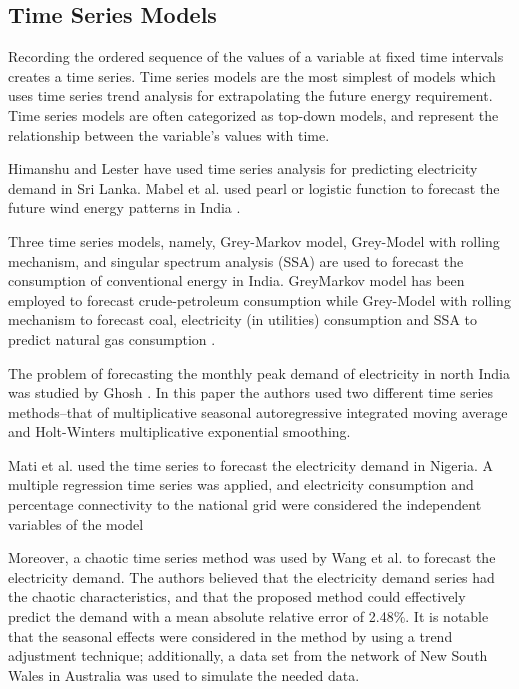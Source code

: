 \documentclass[lettersize,journal]{IEEEtran}
\begin{document}
  \subsection{Time Series Models}

Recording the ordered sequence of the values of a variable at fixed time intervals creates a time series. Time series models are the most simplest of models which uses time series trend analysis for extrapolating the future energy requirement. Time series models are often categorized as top-down models, and represent the relationship between the variable's values with time.  

Himanshu and Lester \cite{srilanka} have used time series analysis for predicting electricity demand in Sri Lanka. Mabel et al. used pearl or logistic function to forecast the future wind energy patterns in India \cite{TSA-india}.

Three time series models, namely, Grey-Markov model, Grey-Model with rolling mechanism, and singular spectrum analysis (SSA) are used to forecast the consumption of conventional energy in India. GreyMarkov model has been employed to forecast crude-petroleum consumption while Grey-Model with rolling mechanism to forecast coal, electricity (in utilities) consumption and SSA to predict natural gas consumption \cite{time-serie india}.

The problem of forecasting the monthly peak demand of electricity in north India was studied by Ghosh \cite{time-serie india ghosh}. In this paper the authors used two different time series methods–that of multiplicative seasonal autoregressive integrated moving average and Holt-Winters multiplicative exponential smoothing. 

Mati et al. \cite{time-serie Nigeria}used the time series to forecast the electricity demand in Nigeria. A multiple regression time series was applied, and electricity consumption and percentage connectivity to the national grid were considered the independent variables of the model

Moreover, a chaotic time series method was used by Wang et al. \cite{time-serie china}to forecast the electricity demand. The authors believed that the electricity demand series had the chaotic characteristics, and that the
proposed method could effectively predict the demand with a mean absolute relative error of 2.48\%. It is notable that the seasonal effects were considered in the method by using a trend adjustment technique; additionally, a data set from the network of New South Wales in Australia was used to simulate the needed data.
\end{document}
